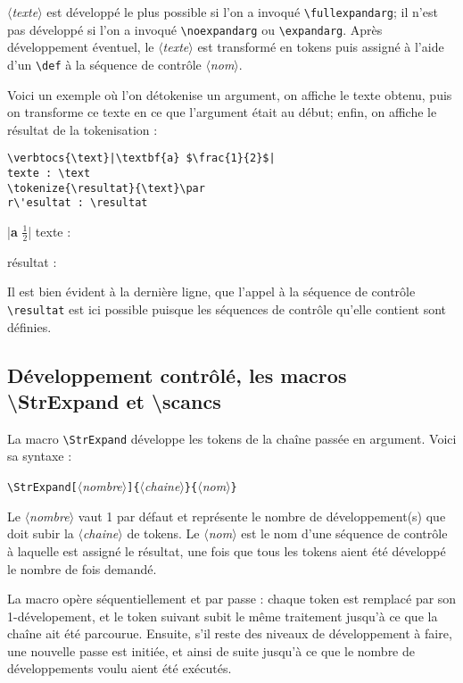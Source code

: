 \documentclass[a4paper,10pt,french]{article}
\newcommand\argu[1]{$\langle$\textit{#1}$\rangle$}
\newcommand\ARGU[1]{\texttt{\color{black}\{}\argu{#1}\texttt{\color{black}\}}}
\newcommand\arguC[1]{\texttt{\color{black}[}\argu{#1}\texttt{\color{black}]}}
\newcommand\styleexercice{\footnotesize}
\newcommand\verbinline{\lstinline[basicstyle=\normalsize\ttfamily]}
\begin{document}
\argu{texte} est développé le plus possible si l'on a invoqué \verbinline|\fullexpandarg|; il n'est pas développé si l'on a invoqué \verbinline|\noexpandarg| ou \verbinline|\expandarg|. Après développement éventuel, le \argu{texte} est transformé en tokens puis assigné à l'aide d'un \verb|\def| à la séquence de contrôle \argu{nom}.\medskip

Voici un exemple où l'on détokenise un argument, on affiche le texte obtenu, puis on transforme ce texte en ce que l'argument était au début; enfin, on affiche le résultat de la tokenisation :\par\nobreak\medskip
\begin{minipage}[c]{0.65\linewidth}
\begin{lstlisting}
\verbtocs{\text}|\textbf{a} $\frac{1}{2}$|
texte : \text
\tokenize{\resultat}{\text}\par
r\'esultat : \resultat
\end{lstlisting}%
\end{minipage}\hfill
\begin{minipage}[c]{0.35\linewidth}
	\styleexercice
	\verbtocs{\text}|\textbf{a} $\frac{1}{2}$|
	texte : \text
	\tokenize{\resultat}{\text}	\par
	r\'esultat : \resultat
\end{minipage}%
\medskip

Il est bien évident à la dernière ligne, que l'appel à la séquence de contrôle \verb|\resultat| est ici possible puisque les séquences de contrôle qu'elle contient sont définies.\medskip

\subsection{Développement contrôlé, les macros  {\ttfamily\textbackslash StrExpand} et {\ttfamily\textbackslash scancs}}
\label{scancs}
La macro \verbinline|\StrExpand| développe les tokens de la chaîne passée en argument. Voici sa syntaxe :\par\nobreak\medskip
\verbinline|\StrExpand|\arguC{nombre}\ARGU{chaine}\ARGU{nom}\smallskip

Le \argu{nombre} vaut 1 par défaut et représente le nombre de développement(s) que doit subir la \argu{chaine} de tokens. Le \argu{nom} est le nom d'une séquence de contrôle à laquelle est assigné le résultat, une fois que tous les tokens aient été développé le nombre de fois demandé.\medskip

La macro opère séquentiellement et par passe : chaque token est remplacé par son 1-dévelopement, et le token suivant subit le même traitement jusqu'à ce que la chaîne ait été parcourue. Ensuite, s'il reste des niveaux de développement à faire, une nouvelle passe est initiée, et ainsi de suite jusqu'à ce que le nombre de développements voulu aient été exécutés.\medskip
\end{document}
